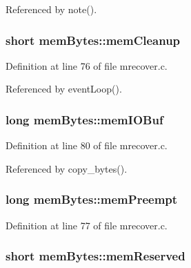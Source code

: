Referenced by note().

\hypertarget{structmemBytes_a6e0e480b64c537412f94f0e2e8a734bb}{
\subsubsection[{mem\+Cleanup}]{\setlength{\rightskip}{0pt plus 5cm}short mem\+Bytes\+::mem\+Cleanup}}\label{structmemBytes_a6e0e480b64c537412f94f0e2e8a734bb}


Definition at line 76 of file mrecover.\+c.



Referenced by event\+Loop().

\hypertarget{structmemBytes_a7ccd8c402ba0f7eef5055a648fe2db80}{
\subsubsection[{mem\+I\+O\+Buf}]{\setlength{\rightskip}{0pt plus 5cm}long mem\+Bytes\+::mem\+I\+O\+Buf}}\label{structmemBytes_a7ccd8c402ba0f7eef5055a648fe2db80}


Definition at line 80 of file mrecover.\+c.



Referenced by copy\+\_\+bytes().

\hypertarget{structmemBytes_aa3df25c1b98b2bcbf2f3ec08831c36bf}{
\subsubsection[{mem\+Preempt}]{\setlength{\rightskip}{0pt plus 5cm}long mem\+Bytes\+::mem\+Preempt}}\label{structmemBytes_aa3df25c1b98b2bcbf2f3ec08831c36bf}


Definition at line 77 of file mrecover.\+c.

\hypertarget{structmemBytes_a26737f2bded40f6fbd5b10abeb668ca4}{
\subsubsection[{mem\+Reserved}]{\setlength{\rightskip}{0pt plus 5cm}short mem\+Bytes\+::mem\+Reserved}}\label{structmemBytes_a26737f2bded40f6fbd5b10abeb668ca4}


